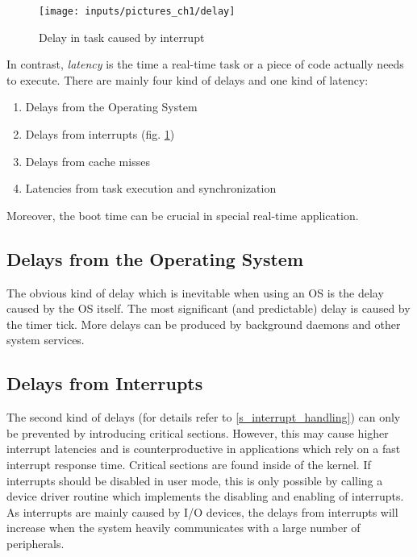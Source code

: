 \begin{figure}[htb]
	\begin{center}
		\texttt{[image: inputs/pictures\_ch1/delay]}
	\end{center}
	\caption[Delay in task caused by interrupt]{Delay in task caused by interrupt} \label{fig_delay}
\end{figure}

In contrast, \textit{latency} is the time a real-time task or a piece of code actually needs to execute. 
There are mainly four kind of delays and one kind of latency:
\begin{enumerate}
	\item Delays from the Operating System
	\item Delays from interrupts (fig. \ref{fig_delay})
	\item Delays from cache misses
	\item Latencies from task execution and synchronization
\end{enumerate}
Moreover, the boot time can be crucial in special real-time application.

\subsection{Delays from the Operating System}
The obvious kind of delay which is inevitable when using an \ac{OS} is the delay caused by the \ac{OS} itself.
The most significant (and predictable) delay is caused by the timer tick.
More delays can be produced by background daemons and other system services. 

\subsection{Delays from Interrupts}
The second kind of delays (for details refer to \ref{s_interrupt_handling}) can only be prevented by introducing critical sections. 
However, this may cause higher interrupt latencies and is counterproductive in applications which rely on a fast interrupt response time.
Critical sections are found inside of the kernel.
If interrupts should be disabled in user mode, this is only possible by calling a device driver routine which implements the disabling and enabling of interrupts.  
As interrupts are mainly caused by \ac{I/O} devices, the delays from interrupts will increase when the system heavily communicates with a large number of peripherals. 

